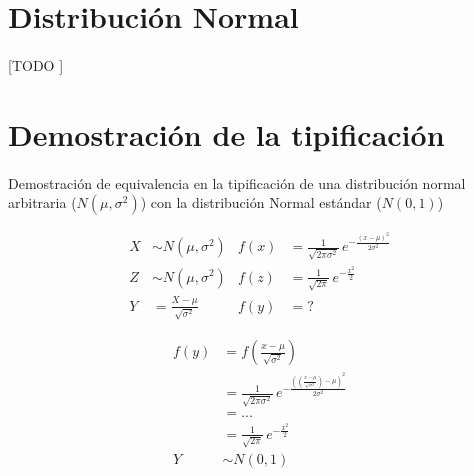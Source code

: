 \documentclass{article}
\begin{document}
	\maketitle
  \thispagestyle{empty}


  \section{Distribución Normal}
  \label{sec:description}

    \paragraph{}
    [TODO ]

  \section{Demostración de la tipificación}
  \label{sec:demostration}

    \paragraph{}
    Demostración de equivalencia en la tipificación de una distribución normal arbitraria ($N(\mu,\sigma^2)$) con la distribución Normal estándar ($N(0,1)$)

    \begin{align}
      X &\sim N(\mu,\sigma^2) & f(x) &= {\displaystyle {\frac {1}{\sqrt {2\pi \sigma ^{2}}}}\,e^{-{\frac {(x-\mu )^{2}}{2\sigma ^{2}}}}}\\
      Z &\sim N(\mu,\sigma^2) & f(z) &= {\displaystyle {\frac {1}{\sqrt {2\pi}}}\,e^{-{\frac {x^{2}}{2}}}} \\
      Y &= \frac{X-\mu}{\sqrt{\sigma^2}} & f(y)&=?
    \end{align}

    \begin{align}
      f(y)  &= f(\frac{x-\mu}{\sqrt{\sigma^2}}) \\
            &= {\displaystyle {\frac {1}{\sqrt {2\pi \sigma ^{2}}}}\,e^{-{\frac {((\frac{x-\mu}{\sqrt{\sigma^2}})-\mu )^{2}}{2\sigma ^{2}}}}} \\
            &= ... \\
            &={\displaystyle {\frac {1}{\sqrt {2\pi}}}\,e^{-{\frac {x^{2}}{2}}}}\\
      Y &\sim N(0,1)
    \end{align}
	\nocite{prob2017}

  
  
\end{document}
